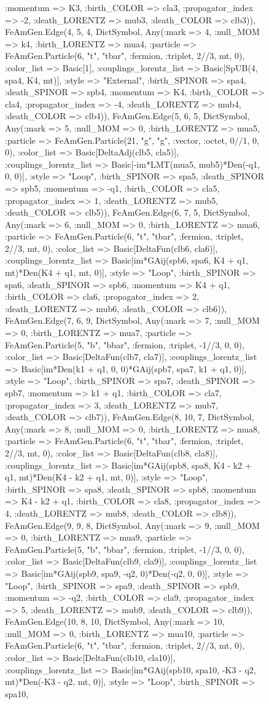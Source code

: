 \documentclass{revtex4}
\begin{document}
\begin{figure}[!htb]
\begin{center}
{:momentum => K3, :birth_COLOR => cla3, :propagator_index => -2, :death_LORENTZ => mub3, :death_COLOR => clb3)), FeAmGen.Edge(4, 5, 4, Dict{Symbol, Any}(:mark => 4, :null_MOM => k4, :birth_LORENTZ => mua4, :particle => FeAmGen.Particle(6, "t", "tbar", :fermion, :triplet, 2//3, mt, 0), :color_list => Basic[1], :couplings_lorentz_list => Basic[SpUB(4, spa4, K4, mt)], :style => "External", :birth_SPINOR => spa4, :death_SPINOR => spb4, :momentum => K4, :birth_COLOR => cla4, :propagator_index => -4, :death_LORENTZ => mub4, :death_COLOR => clb4)), FeAmGen.Edge(5, 6, 5, Dict{Symbol, Any}(:mark => 5, :null_MOM => 0, :birth_LORENTZ => mua5, :particle => FeAmGen.Particle(21, "g", "g", :vector, :octet, 0//1, 0, 0), :color_list => Basic[DeltaAdj(clb5, cla5)], :couplings_lorentz_list => Basic[-im*LMT(mua5, mub5)*Den(-q1, 0, 0)], :style => "Loop", :birth_SPINOR => spa5, :death_SPINOR => spb5, :momentum => -q1, :birth_COLOR => cla5, :propagator_index => 1, :death_LORENTZ => mub5, :death_COLOR => clb5)), FeAmGen.Edge(6, 7, 5, Dict{Symbol, Any}(:mark => 6, :null_MOM => 0, :birth_LORENTZ => mua6, :particle => FeAmGen.Particle(6, "t", "tbar", :fermion, :triplet, 2//3, mt, 0), :color_list => Basic[DeltaFun(clb6, cla6)], :couplings_lorentz_list => Basic[im*GAij(spb6, spa6, K4 + q1, mt)*Den(K4 + q1, mt, 0)], :style => "Loop", :birth_SPINOR => spa6, :death_SPINOR => spb6, :momentum => K4 + q1, :birth_COLOR => cla6, :propagator_index => 2, :death_LORENTZ => mub6, :death_COLOR => clb6)), FeAmGen.Edge(7, 6, 9, Dict{Symbol, Any}(:mark => 7, :null_MOM => 0, :birth_LORENTZ => mua7, :particle => FeAmGen.Particle(5, "b", "bbar", :fermion, :triplet, -1//3, 0, 0), :color_list => Basic[DeltaFun(clb7, cla7)], :couplings_lorentz_list => Basic[im*Den(k1 + q1, 0, 0)*GAij(spb7, spa7, k1 + q1, 0)], :style => "Loop", :birth_SPINOR => spa7, :death_SPINOR => spb7, :momentum => k1 + q1, :birth_COLOR => cla7, :propagator_index => 3, :death_LORENTZ => mub7, :death_COLOR => clb7)), FeAmGen.Edge(8, 10, 7, Dict{Symbol, Any}(:mark => 8, :null_MOM => 0, :birth_LORENTZ => mua8, :particle => FeAmGen.Particle(6, "t", "tbar", :fermion, :triplet, 2//3, mt, 0), :color_list => Basic[DeltaFun(clb8, cla8)], :couplings_lorentz_list => Basic[im*GAij(spb8, spa8, K4 - k2 + q1, mt)*Den(K4 - k2 + q1, mt, 0)], :style => "Loop", :birth_SPINOR => spa8, :death_SPINOR => spb8, :momentum => K4 - k2 + q1, :birth_COLOR => cla8, :propagator_index => 4, :death_LORENTZ => mub8, :death_COLOR => clb8)), FeAmGen.Edge(9, 9, 8, Dict{Symbol, Any}(:mark => 9, :null_MOM => 0, :birth_LORENTZ => mua9, :particle => FeAmGen.Particle(5, "b", "bbar", :fermion, :triplet, -1//3, 0, 0), :color_list => Basic[DeltaFun(clb9, cla9)], :couplings_lorentz_list => Basic[im*GAij(spb9, spa9, -q2, 0)*Den(-q2, 0, 0)], :style => "Loop", :birth_SPINOR => spa9, :death_SPINOR => spb9, :momentum => -q2, :birth_COLOR => cla9, :propagator_index => 5, :death_LORENTZ => mub9, :death_COLOR => clb9)), FeAmGen.Edge(10, 8, 10, Dict{Symbol, Any}(:mark => 10, :null_MOM => 0, :birth_LORENTZ => mua10, :particle => FeAmGen.Particle(6, "t", "tbar", :fermion, :triplet, 2//3, mt, 0), :color_list => Basic[DeltaFun(clb10, cla10)], :couplings_lorentz_list => Basic[im*GAij(spb10, spa10, -K3 - q2, mt)*Den(-K3 - q2, mt, 0)], :style => "Loop", :birth_SPINOR => spa10, }
\end{center}
\end{figure}
\end{document}
